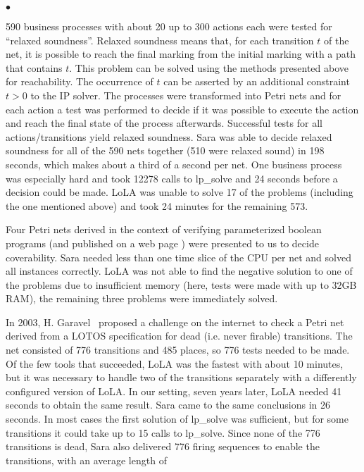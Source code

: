 \documentclass{LMCS}
\begin{document}
\begin{iteMize}{$\bullet$}
\item 590 business processes with about 20 up to 300 actions each were tested for ``relaxed
soundness''. Relaxed soundness means that, for each transition $t$ of the net, it is possible to reach the final marking from the initial marking with a path that contains $t$. 
This problem can be solved using the methods presented above for reachability. The occurrence of $t$ can be asserted by an additional constraint $t > 0$ to the IP solver.
The processes were transformed into Petri nets and for each action a test was performed
to decide if it was possible to execute the action and reach the final state of the process afterwards.
Successful tests for all actions/transitions yield relaxed soundness.
Sara was able to decide relaxed soundness for all of the 590 nets together (510 were relaxed sound)
in 198 seconds, which makes
about a third of a second per net. One business process was especially hard and took 12278 calls
to lp\_solve and 24 seconds before a decision could be made. LoLA was unable to solve 17
of the problems (including the one mentioned above) and took 24 minutes for the remaining 573. 
\item Four Petri nets derived in the context of verifying parameterized boolean programs (and published on a web page \cite{wsts}) were presented to us to decide coverability.
Sara needed less than one time slice of the CPU per net and solved all instances correctly.
LoLA was not able to find the negative solution to one of the problems due to insufficient memory (here, tests were made with up to 32GB RAM),
the remaining three problems were immediately solved.
\item In 2003, H. Garavel~\cite{garavel03} proposed a challenge on the internet to check a Petri net derived from
a LOTOS specification for dead (i.e. never firable) transitions. The net consisted of 776 transitions
and 485 places, so 776 tests needed to be made. Of the few tools that succeeded, LoLA was the fastest
with about 10 minutes, but it was necessary to handle two of the transitions separately with a differently
configured version of LoLA. In our setting, seven years later, LoLA needed 41 seconds to obtain the
same result. Sara came to the same conclusions in 26 seconds. In most cases the first solution of
lp\_solve was sufficient, but for some transitions it could take up to 15 calls
to lp\_solve. Since none of the 776 transitions is dead,
Sara also delivered 776 firing sequences to enable the transitions, with an average length of

\end{iteMize}
\end{document}
